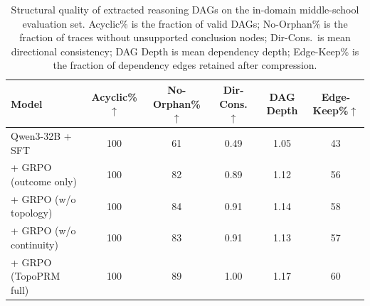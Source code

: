 \begin{table}[H]
\centering
\caption{Structural quality of extracted reasoning DAGs on the in-domain middle-school evaluation set.
  Acyclic\% is the fraction of valid DAGs;
  No-Orphan\% is the fraction of traces without unsupported conclusion nodes;
  Dir-Cons.\ is mean directional consistency;
  DAG Depth is mean dependency depth;
  Edge-Keep\% is the fraction of dependency edges retained after compression.}
\label{tab:structural_metrics}
\vspace{2pt}
\small
\begin{tabular}{@{}l ccccc@{}}
\toprule
\textbf{Model}
  & \textbf{Acyclic\%}$\uparrow$
  & \textbf{No-Orphan\%}$\uparrow$
  & \textbf{Dir-Cons.}$\uparrow$
  & \textbf{DAG Depth}
  & \textbf{Edge-Keep\%}$\uparrow$ \\
\midrule
Qwen3-32B + SFT              & 100 & 61 & 0.49 & 1.05 & 43 \\
\quad + GRPO (outcome only)   & 100 & 82 & 0.89 & 1.12 & 56 \\
\quad + GRPO (w/o topology)   & 100 & 84 & 0.91 & 1.14 & 58 \\
\quad + GRPO (w/o continuity) & 100 & 83 & 0.91 & 1.13 & 57 \\
\rowcolor{blue!5}
\quad + GRPO (TopoPRM full)   & 100 & 89 & 1.00 & 1.17 & 60 \\
\bottomrule
\end{tabular}
\end{table}